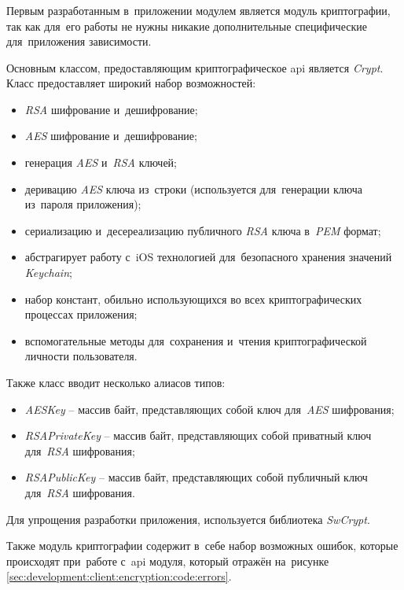 \subsubsection{}
\label{sec:development:client:encryption}

Первым разработанным в~приложении модулем является модуль криптографии, так как для~его работы не нужны никакие дополнительные специфические для~приложения зависимости.

Основным классом, предоставляющим криптографическое \gls{api} является \textit{Crypt}. Класс предоставляет широкий набор возможностей:

\begin{itemize}
	\item \textit{RSA} шифрование и~дешифрование;
	\item \textit{AES} шифрование и~дешифрование;
	\item генерация \textit{AES} и~\textit{RSA} ключей;
	\item деривацию \textit{AES} ключа из~строки (используется для~генерации ключа из~пароля приложения);
	\item сериализацию и~десереализацию публичного \textit{RSA} ключа в~\textit{PEM} формат;
	\item абстрагирует работу с~iOS технологией для~безопасного хранения значений \textit{Keychain};
	\item набор констант, обильно использующихся во всех криптографических процессах приложения;
	\item вспомогательные методы для~сохранения и~чтения криптографической личности пользователя.
\end{itemize}

Также класс вводит несколько алиасов типов:
\begin{itemize}
	\item \textit{AESKey} -- массив байт, представляющих собой ключ для~\textit{AES} шифрования;
	\item \textit{RSAPrivateKey} -- массив байт, представляющих собой приватный ключ для~\textit{RSA} шифрования;
	\item \textit{RSAPublicKey} -- массив байт, представляющих собой публичный ключ для~\textit{RSA} шифрования.
\end{itemize}

Для упрощения разработки приложения, используется библиотека \textit{SwCrypt}.

Также модуль криптографии содержит в~себе набор возможных ошибок, которые происходят при~работе с~\gls{api} модуля, который отражён на~рисунке \ref{sec:development:client:encryption:code:errors}.

